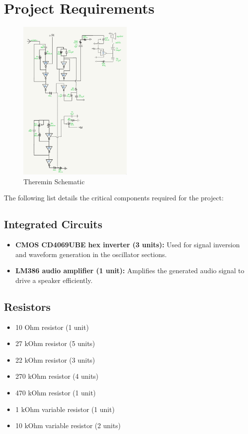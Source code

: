 \documentclass{article}
\numberwithin{equation}{section}
\begin{document}
\section{Project Requirements}

\begin{figure}[H]
    \includegraphics[width=0.5\textwidth]{theremin_circuit.png}
    \caption{Theremin Schematic}
    \label{fig:theremin}
\end{figure}

The following list details the critical components required for the project:

\subsection*{Integrated Circuits}
\begin{itemize}
    \item \textbf{CMOS CD4069UBE hex inverter (3 units):} Used for signal inversion and waveform generation in the oscillator sections.
    \item \textbf{LM386 audio amplifier (1 unit):} Amplifies the generated audio signal to drive a speaker efficiently.
\end{itemize}

\subsection*{Resistors}
\begin{itemize}
    \item 10 Ohm resistor (1 unit)
    \item 27 kOhm resistor (5 units)
    \item 22 kOhm resistor (3 units)
    \item 270 kOhm resistor (4 units)
    \item 470 kOhm resistor (1 unit)
    \item 1 kOhm variable resistor (1 unit)
    \item 10 kOhm variable resistor (2 units)
\end{itemize}
\end{document}
